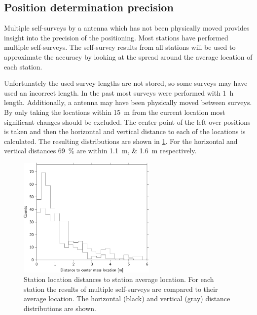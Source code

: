 \subsection{Position determination precision}

Multiple self-surveys by a \gps antenna which has not been physically moved provides insight into the precision of the positioning. Most \hisparc stations have performed multiple self-surveys. The self-survey results from all \hisparc stations will be used to approximate the \gps accuracy by looking at the spread around the average location of each station.

Unfortunately the used survey lengths are not stored, so some surveys may have used an incorrect length. In the past most surveys were performed with \SI{1}{\hour} length. Additionally, a \gps antenna may have been physically moved between surveys. By only taking the \gps locations within \SI{15}{\meter} from the current location most significant changes should be excluded. The center point of the left-over positions is taken and then the horizontal and vertical distance to each of the locations is calculated. The resulting distributions are shown in \cref{fig:gps_distance_cm_all}. For the horizontal and vertical distances \SI{69}{\percent} are within \SIlist{1.1;1.6}{\meter} respectively.

\begin{figure}
    \centering
    \includegraphics[width=0.6\textwidth]
                    {plots/cluster/gps_distance_cm_all}
    \caption{Station \gps location distances to station average location. For each station the results of multiple self-surveys are compared to their average location. The horizontal (black) and vertical (gray) distance distributions are shown.}
    \label{fig:gps_distance_cm_all}
\end{figure}

